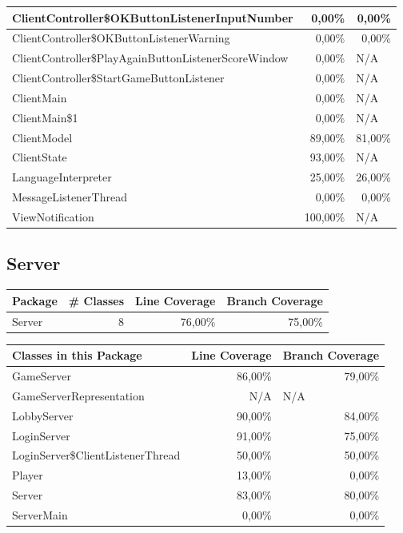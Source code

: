 \documentclass[a4paper]{article}
\begin{document}
\begin{tabular}{|l|r|l|}
ClientController\$OKButtonListenerInputNumber & 0,00\% & \multicolumn{1}{r|}{0,00\%} \\ \hline
ClientController\$OKButtonListenerWarning & 0,00\% & \multicolumn{1}{r|}{0,00\%} \\ \hline
ClientController\$PlayAgainButtonListenerScoreWindow & 0,00\% & N/A \\ \hline
ClientController\$StartGameButtonListener & 0,00\% & N/A \\ \hline
ClientMain & 0,00\% & N/A \\ \hline
ClientMain\$1 & 0,00\% & N/A \\ \hline
ClientModel & 89,00\% & \multicolumn{1}{r|}{81,00\%} \\ \hline
ClientState & 93,00\% & N/A \\ \hline
LanguageInterpreter & 25,00\% & \multicolumn{1}{r|}{26,00\%} \\ \hline
MessageListenerThread & 0,00\% & \multicolumn{1}{r|}{0,00\%} \\ \hline
ViewNotification & 100,00\% & N/A \\ \hline
\end{tabular}


	\subsection{Server}

	\noindent	
\begin{tabular}{|l|l|l|l|}
\hline
Package & \# Classes & Line Coverage & Branch Coverage \\ \hline \hline
Server & \multicolumn{1}{r|}{8} & \multicolumn{1}{r|}{76,00\%} & \multicolumn{1}{r|}{75,00\%} \\ \hline
\end{tabular}

\noindent
\begin{tabular}{|l|r|r|}
\hline
Classes in this Package & \multicolumn{1}{l|}{Line Coverage} & \multicolumn{1}{l|}{Branch Coverage} \\ \hline
GameServer & 86,00\% & 79,00\% \\ \hline
GameServerRepresentation & N/A & \multicolumn{1}{l|}{N/A} \\ \hline
LobbyServer & 90,00\% & 84,00\% \\ \hline
LoginServer & 91,00\% & 75,00\% \\ \hline
LoginServer\$ClientListenerThread & 50,00\% & 50,00\% \\ \hline
Player & 13,00\% & 0,00\% \\ \hline
Server & 83,00\% & 80,00\% \\ \hline
ServerMain & 0,00\% & 0,00\% \\ \hline
\end{tabular}
\end{document}
